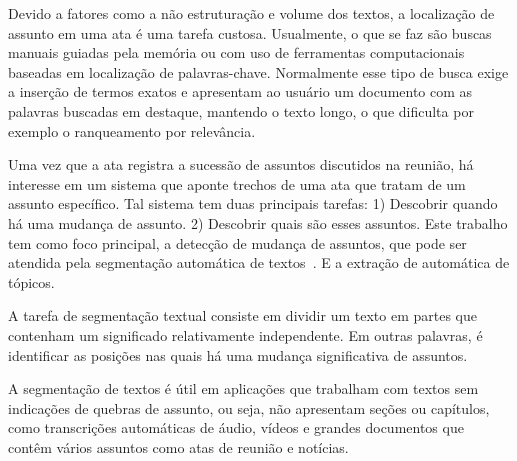 



%  
Devido a fatores como a não estruturação e volume dos textos, a localização de assunto em uma ata é uma tarefa custosa.  Usualmente, o que se faz são buscas manuais guiadas pela memória ou com uso de ferramentas computacionais baseadas em localização de palavras-chave.  Normalmente esse tipo de busca exige a inserção de termos exatos e 
apresentam ao usuário um documento com as palavras buscadas em destaque, mantendo o texto longo, o que dificulta por exemplo o ranqueamento por relevância. 






Uma vez que a ata registra a sucessão de assuntos discutidos na reunião, há interesse em um sistema que aponte trechos de uma ata que tratam de um assunto específico. Tal sistema tem duas principais tarefas: 1) Descobrir quando há uma mudança de assunto. 2) Descobrir quais são esses assuntos. Este trabalho tem como foco principal, a detecção de mudança de assuntos, que pode ser atendida pela segmentação automática de textos~\cite{Chen2017,Naili2016,Cardoso2017}. E a extração de automática de tópicos. 



A tarefa de segmentação textual consiste em dividir um texto em partes que contenham um significado relativamente independente. Em outras palavras, é identificar as posições nas quais há uma mudança significativa de assuntos. 

A segmentação de textos é útil em aplicações que trabalham com textos sem indicações de quebras de assunto, ou seja, não apresentam seções ou capítulos, como transcrições automáticas de áudio, vídeos e grandes documentos que contêm vários assuntos como atas de reunião e notícias.


